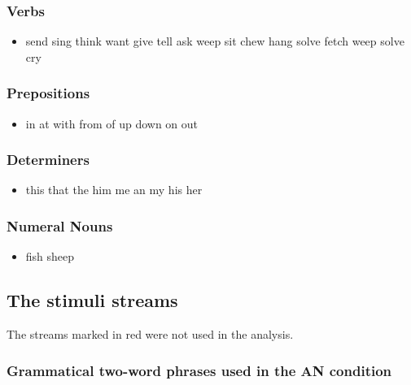 \documentclass[10pt,letterpaper]{article}
\begin{document}
\subsubsection*{Verbs}
\begin{itemize}
  \item send sing think want give tell ask weep sit chew hang solve
    fetch weep solve cry
\end{itemize}

\subsubsection*{Prepositions}
\begin{itemize}
  \item in at with from of up down on out
\end{itemize}

\subsubsection*{Determiners}
\begin{itemize}
  \item this that the him me an my his her
\end{itemize}

\subsubsection*{Numeral Nouns}
\begin{itemize}
  \item fish sheep
  
\end{itemize}

\subsection*{The stimuli streams}

The streams marked in red were not used in the analysis.

\subsubsection*{Grammatical two-word phrases used in the AN condition}
\end{document}
